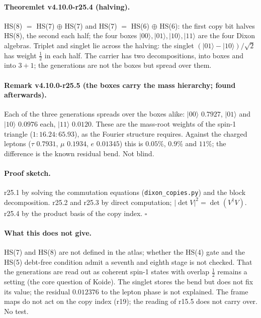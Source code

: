 \paragraph{Theoremlet v4.10.0-r25.4 (halving).}
HS(8) \(=\) HS(7) \(\oplus\) HS(7) and HS(7) \(=\) HS(6) \(\oplus\) HS(6): the first copy bit halves HS(8), the second each half; the four boxes
\(|00\rangle,|01\rangle,|10\rangle,|11\rangle\) are the four Dixon algebras.  Triplet and singlet lie across the halving: the singlet
\((|01\rangle-|10\rangle)/\sqrt2\) has weight \(\tfrac12\) in each half.  The carrier has two decompositions, into boxes and into \(3+1\); the
generations are not the boxes but spread over them.

\paragraph{Remark v4.10.0-r25.5 (the boxes carry the mass hierarchy; found afterwards).}
Each of the three generations spreads over the boxes alike: \(|00\rangle\) \(0.7927\), \(|01\rangle\) and \(|10\rangle\) \(0.0976\) each, \(|11\rangle\)
\(0.0120\).  These are the mass-root weights of the spin-1 triangle (\(1:16.24:65.93\)), as the Fourier structure requires.  Against the charged
leptons (\(\tau\) \(0.7931\), \(\mu\) \(0.1934\), \(e\) \(0.01345\)) this is \(0.05\%\), \(0.9\%\) and \(11\%\); the difference is the known residual bend.  Not
blind.

\paragraph{Proof sketch.}
r25.1 by solving the commutation equations (\texttt{dixon\_\allowbreak copies.py}) and the block decomposition.  r25.2 and r25.3 by direct
computation; \(|\det V|^2=\det(V^\dagger V)\).  r25.4 by the product basis of the copy index.  \(\square\)

\paragraph{What this does not give.}
HS(7) and HS(8) are not defined in the atlas; whether the HS(4) gate and the HS(5) debt-free condition admit a seventh and eighth stage is not
checked.  That the generations are read out as coherent spin-1 states with overlap \(\tfrac12\) remains a setting (the core question of
Koide).  The singlet stores the bend but does not fix its value; the residual \(0.012376\) to the lepton phase is not explained.  The frame maps
do not act on the copy index (r19); the reading of r15.5 does not carry over.  No test.

